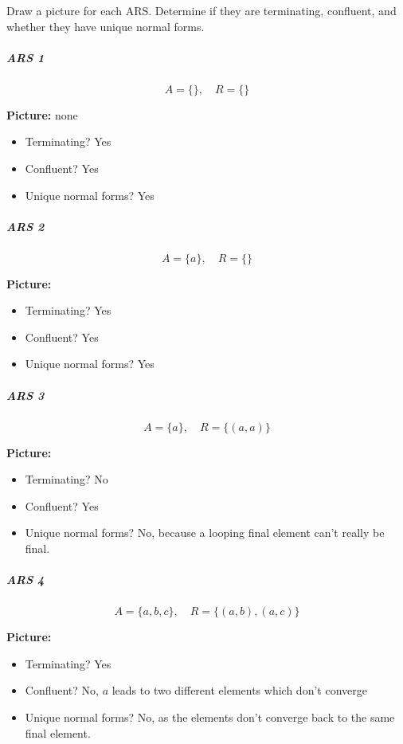 \documentclass{article}
\theoremstyle{plain}
\theoremstyle{definition}
\theoremstyle{remark}
\begin{document}
Draw a picture for each ARS. Determine if they are terminating, confluent, and whether they have unique normal forms.

\subparagraph{ARS 1}
\[
A = \{\}, \quad R = \{\}
\]

\textbf{Picture:} none

\begin{itemize}
    \item Terminating? Yes
    \item Confluent? Yes
    \item Unique normal forms? Yes
\end{itemize}

\subparagraph{ARS 2}
\[
A = \{a\}, \quad R = \{\}
\]

\textbf{Picture:}

\begin{itemize}
    \item Terminating? Yes
    \item Confluent? Yes
    \item Unique normal forms? Yes
\end{itemize}

\subparagraph{ARS 3}
\[
A = \{a\}, \quad R = \{(a,a)\}
\]

\textbf{Picture:}

\begin{itemize}
    \item Terminating? No
    \item Confluent? Yes
    \item Unique normal forms? No, because a looping final element can't really be final. 
\end{itemize}

\subparagraph{ARS 4}
\[
A = \{a,b,c\}, \quad R = \{(a,b),(a,c)\}
\]

\textbf{Picture:}

\begin{itemize}
    \item Terminating? Yes
    \item Confluent? No, $a$ leads to two different elements which don't converge
    \item Unique normal forms? No, as the elements don't converge back to the same final element.
\end{itemize}
\end{document}

